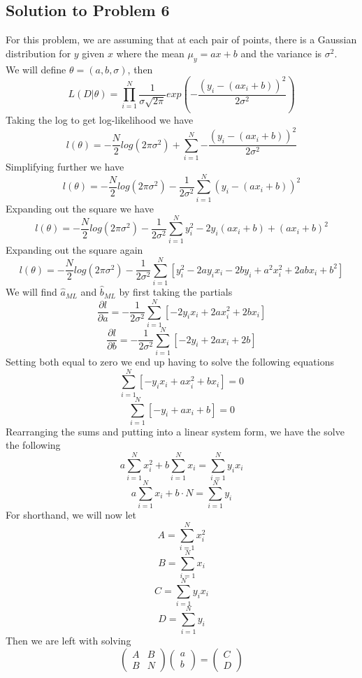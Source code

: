\documentclass[11pt,psfig]{article}
\begin{document}
\subsection*{Solution to Problem 6}

For this problem, we are assuming that at each pair of points, there is a Gaussian distribution for $y$ given $x$ where the mean $\mu_y = ax+b$ and the variance is $\sigma^2$.
\\
We will define $\theta=(a,b,\sigma)$, then
\[
L(D|\theta) = \prod_{i=1}^N{ \frac{1}{\sigma \sqrt{2\pi}} exp(-\frac{(y_i - (ax_i + b))^2}{2\sigma^2})}
\]
Taking the log to get log-likelihood we have
\[
l(\theta) = -\frac{N}{2} log(2\pi \sigma^2) + \sum_{i=1}^N{-\frac{(y_i - (ax_i + b))^2}{2\sigma^2}}
\]
Simplifying further we have
\[
l(\theta) = -\frac{N}{2} log(2\pi \sigma^2) - \frac{1}{2\sigma^2} \sum_{i=1}^N{(y_i - (ax_i + b))^2}
\]
Expanding out the square we have
\[
l(\theta) = -\frac{N}{2} log(2\pi \sigma^2) - \frac{1}{2\sigma^2} \sum_{i=1}^N{y_i^2 -2y_i (ax_i + b) + (ax_i + b)^2}
\]
Expanding out the square again
\[
l(\theta) = -\frac{N}{2} log(2\pi \sigma^2) - \frac{1}{2\sigma^2} \sum_{i=1}^N{[y_i^2 -2ay_i x_i -2by_i + a^2 x_i^2 + 2abx_i + b^2]}
\]
We will find $\hat{a}_{ML}$ and $\hat{b}_{ML}$ by first taking the partials
\[
\frac{\partial l}{\partial a} = - \frac{1}{2\sigma^2} \sum_{i=1}^N{[-2y_i x_i + 2a x_i^2 + 2bx_i]}
\]
\[
\frac{\partial l}{\partial b} = - \frac{1}{2\sigma^2} \sum_{i=1}^N{[-2y_i + 2a x_i + 2b]}
\]
Setting both equal to zero we end up having to solve the following equations
\[
\sum_{i=1}^N{[-y_i x_i + a x_i^2 + bx_i]} = 0
\]
\[
\sum_{i=1}^N{[-y_i + a x_i + b]} = 0
\]
Rearranging the sums and putting into a linear system form, we have the solve the following
\[
a\sum_{i=1}^N{x_i^2} + b\sum_{i=1}^N{x_i} = \sum_{i=1}^N{y_i x_i}
\]
\[
a\sum_{i=1}^N{x_i} + b \cdot N = \sum_{i=1}^N{y_i}
\]
For shorthand, we will now let
\[
A = \sum_{i=1}^N{x_i^2}
\]
\[
B = \sum_{i=1}^N{x_i}
\]
\[
C = \sum_{i=1}^N{y_i x_i}
\]
\[
D = \sum_{i=1}^N{y_i}
\]
Then we are left with solving
\[ \left( \begin{array}{ccc}
A & B \\
B & N \end{array} \right)
\left( \begin{array}{ccc}
a \\
b \end{array} \right)=
\left( \begin{array}{ccc}
C \\
D \end{array} \right)\]
\end{document}
